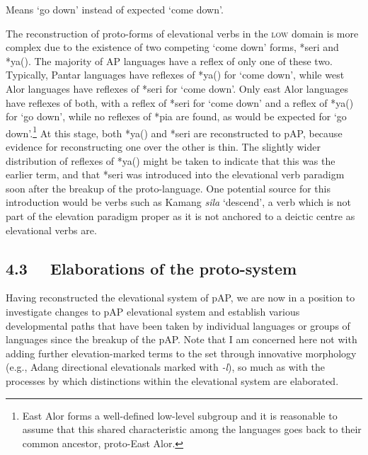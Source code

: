 {\ddag} Means {\textquoteleft}go down{\textquoteright} instead of expected {\textquoteleft}come down{\textquoteright}.

The reconstruction of proto-forms of elevational verbs in the \textsc{low }domain is more complex due to the existence of two competing {\textquoteleft}come down{\textquoteright} forms, *seri and *ya({\ng}). The majority of AP languages have a reflex of only one of these two. Typically, Pantar languages have reflexes of *ya({\ng}) for {\textquoteleft}come down{\textquoteright}, while west Alor languages have reflexes of *seri for {\textquoteleft}come down{\textquoteright}. Only east Alor languages have reflexes of both, with a reflex of *seri for {\textquoteleft}come down{\textquoteright} and a reflex of *ya({\ng}) for {\textquoteleft}go down{\textquoteright}, while no reflexes of *pia are found, as would be expected for {\textquoteleft}go down{\textquoteright}.\footnote{East Alor forms a well-defined low-level subgroup and it is reasonable to assume that this shared characteristic among the languages goes back to their common ancestor, proto-East Alor.} At this stage, both *ya({\ng}) and *seri are 
reconstructed to pAP, because evidence for reconstructing one over the other is thin. The slightly wider distribution of reflexes of *ya({\ng}) might be taken to indicate that this was the earlier term, and that *seri was introduced into the elevational verb paradigm soon after the breakup of the proto-language. One potential source for this introduction would be verbs such as Kamang \textit{sila}\textit{{\ng}} {\textquoteleft}descend{\textquoteright}, a verb which is not part of the elevation paradigm proper as it is not anchored to a deictic centre as elevational verbs are. 

\subsection[4.3 \ \ Elaborations of the proto{}-system]{4.3 \ \ Elaborations of the proto-system}
Having reconstructed the elevational system of pAP, we are now in a position to investigate changes to pAP elevational system and establish various developmental paths that have been taken by individual languages or groups of languages since the breakup of the pAP. Note that I am concerned here not with adding further elevation-marked terms to the set through innovative morphology (e.g., Adang directional elevationals marked with \textit{{}-}\textit{l}\textit{{\textepsilon}}), so much as with the processes by which distinctions within the elevational system are elaborated. 

